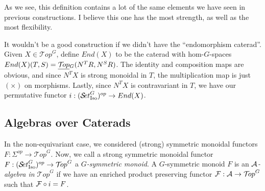 \documentclass{report}
\newcommand{\Top}{\text{$\mathcal{T}\!op$}}
\newcommand{\Set}{\text{$\mathcal{S}\!et$}}
\newcommand{\TopG}{\text{\underline{$\Top$}$_G$}}
\newcommand{\SetGI}{\text{$\Set^G_{\mbox{\scriptsize Iso}}$}}
\begin{document}
As we see, this definition contains a lot of the same elements we have seen in previous constructions. I believe this one has the most strength, as well as the most flexibility.

\begin{example}
  It wouldn't be a good construction if we didn't have the ``endomorphism caterad''. Given $X\in\Top^G$, define $End(X)$ to be the caterad with hom-$G$-spaces $End(X)(T,S) = \TopG(N^TR,N^SR)$. The identity and composition maps are obvious, and since $N^TX$ is strong monoidal in $T$, the multiplication map is just $(\times)$ on morphisms. Lastly, since $N^TX$ is contravariant in $T$, we have our permutative functor $i: (\SetGI)^{op}\to End(X)$.
\end{example}


\subsection{Algebras over Caterads}
In the non-equivariant case, we considered (strong) symmetric monoidal functors $F: \Sigma^{op}\to\Top^G$. Now, we call a strong symmetric monoidal functor $F:(\SetGI)^{op}\to \Top^G$ a {\em $G$-symmetric monoid}. A $G$-symmetric monoid $F$ is an {\em $\text{$\mathcal{A}$}$-algebra in $\Top^G$} if we have an enriched product preserving functor $\F: \A\to\Top^G$ such that $\text{$\mathcal{F}$}\circ i = F$. 
\end{document}
